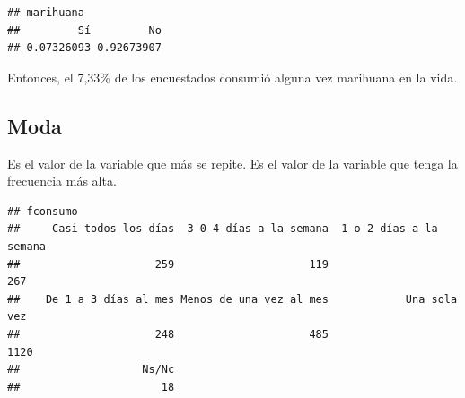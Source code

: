 \documentclass[spanish,]{book}
\newenvironment{Shaded}{\begin{snugshade}}{\end{snugshade}}
\newcommand{\KeywordTok}[1]{\textcolor[rgb]{0.13,0.29,0.53}{\textbf{#1}}}
\newcommand{\DataTypeTok}[1]{\textcolor[rgb]{0.13,0.29,0.53}{#1}}
\newcommand{\DecValTok}[1]{\textcolor[rgb]{0.00,0.00,0.81}{#1}}
\newcommand{\StringTok}[1]{\textcolor[rgb]{0.31,0.60,0.02}{#1}}
\newcommand{\OperatorTok}[1]{\textcolor[rgb]{0.81,0.36,0.00}{\textbf{#1}}}
\newcommand{\NormalTok}[1]{#1}
\begin{document}
\begin{verbatim}
## marihuana
##         Sí         No 
## 0.07326093 0.92673907
\end{verbatim}

Entonces, el 7,33\% de los encuestados consumió alguna vez marihuana en
la vida.

\subsection{Moda}\label{moda}

Es el valor de la variable que más se repite. Es el valor de la variable
que tenga la frecuencia más alta.

\begin{Shaded}
\end{Shaded}

\begin{verbatim}
## fconsumo
##     Casi todos los días  3 0 4 días a la semana  1 o 2 días a la semana 
##                     259                     119                     267 
##    De 1 a 3 días al mes Menos de una vez al mes            Una sola vez 
##                     248                     485                    1120 
##                   Ns/Nc 
##                      18
\end{verbatim}
\end{document}
